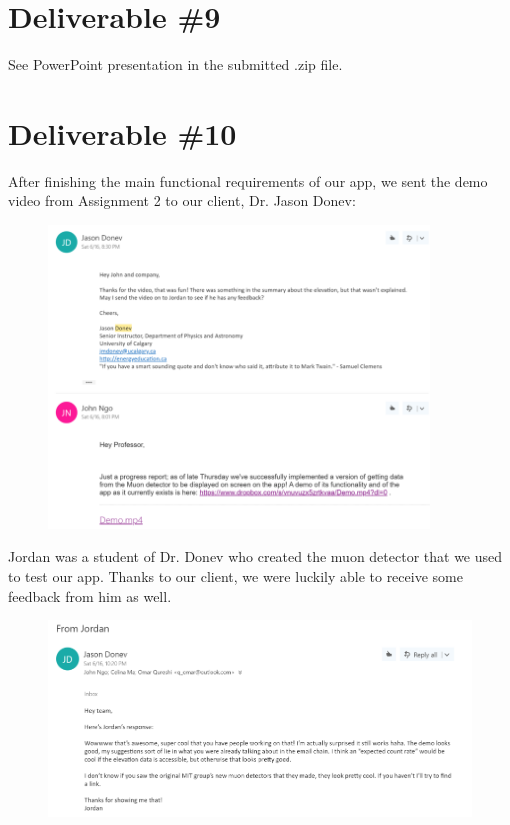 \documentclass[11pt,a4paper]{article}
\begin{document}
\section*{Deliverable \#9}

See PowerPoint presentation in the submitted .zip file.


\section*{Deliverable \#10}

After finishing the main functional requirements of our app, we sent the demo video from Assignment 2 to our client, Dr. Jason Donev:

\begin{figure}[h] \centering
	\includegraphics[width=0.9\textwidth]{email1.png}
\end{figure}

\newpage
Jordan was a student of Dr. Donev who created the muon detector that we used to test our app. Thanks to our client, we were luckily able to receive some feedback from him as well.

\begin{figure}[h] \centering
	\includegraphics[width=1.08\textwidth]{email2.png}
\end{figure}
\end{document}

